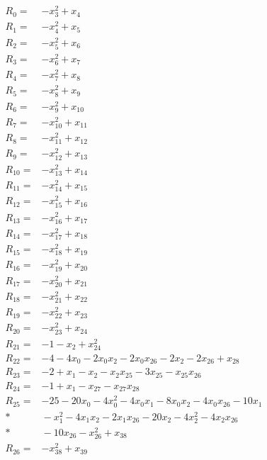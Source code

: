\begingroup\small
\allowdisplaybreaks[4]
\setlength{\jot}{2pt}
\begin{align*}
R_{0}={}&-x_{3}^{2}+x_{4}\\[3pt]
R_{1}={}&-x_{4}^{2}+x_{5}\\[3pt]
R_{2}={}&-x_{5}^{2}+x_{6}\\[3pt]
R_{3}={}&-x_{6}^{2}+x_{7}\\[3pt]
R_{4}={}&-x_{7}^{2}+x_{8}\\[3pt]
R_{5}={}&-x_{8}^{2}+x_{9}\\[3pt]
R_{6}={}&-x_{9}^{2}+x_{10}\\[3pt]
R_{7}={}&-x_{10}^{2}+x_{11}\\[3pt]
R_{8}={}&-x_{11}^{2}+x_{12}\\[3pt]
R_{9}={}&-x_{12}^{2}+x_{13}\\[3pt]
R_{10}={}&-x_{13}^{2}+x_{14}\\[3pt]
R_{11}={}&-x_{14}^{2}+x_{15}\\[3pt]
R_{12}={}&-x_{15}^{2}+x_{16}\\[3pt]
R_{13}={}&-x_{16}^{2}+x_{17}\\[3pt]
R_{14}={}&-x_{17}^{2}+x_{18}\\[3pt]
R_{15}={}&-x_{18}^{2}+x_{19}\\[3pt]
R_{16}={}&-x_{19}^{2}+x_{20}\\[3pt]
R_{17}={}&-x_{20}^{2}+x_{21}\\[3pt]
R_{18}={}&-x_{21}^{2}+x_{22}\\[3pt]
R_{19}={}&-x_{22}^{2}+x_{23}\\[3pt]
R_{20}={}&-x_{23}^{2}+x_{24}\\[3pt]
R_{21}={}&-1-x_{2}+x_{24}^{2}\\[3pt]
R_{22}={}&-4-4x_{0}-2x_{0}x_{2}-2x_{0}x_{26}-2x_{2}-2x_{26}+x_{28}\\[3pt]
R_{23}={}&-2+x_{1}-x_{2}-x_{2}x_{25}-3x_{25}-x_{25}x_{26}\\[3pt]
R_{24}={}&-1+x_{1}-x_{27}-x_{27}x_{28}\\[3pt]
R_{25}={}&-25-20x_{0}-4x_{0}^{2}-4x_{0}x_{1}-8x_{0}x_{2}-4x_{0}x_{26}-10x_{1}\\*
&{}-x_{1}^{2}-4x_{1}x_{2}-2x_{1}x_{26}-20x_{2}-4x_{2}^{2}-4x_{2}x_{26}\\*
&{}-10x_{26}-x_{26}^{2}+x_{38}\\[3pt]
R_{26}={}&-x_{38}^{2}+x_{39}\\[3pt]

\end{align*}
